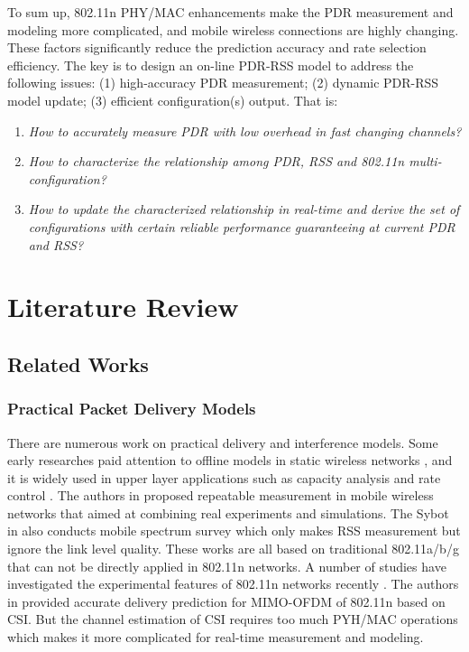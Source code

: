 \documentclass[draftclsnofoot,journal,onecolumn,11pt]{IEEEtran}
\begin{document}
To sum up, 802.11n PHY/MAC enhancements make the PDR measurement and modeling more complicated, and mobile wireless connections are highly changing. These factors significantly reduce the prediction accuracy and rate selection efficiency. The key is to design an on-line PDR-RSS model to address the following issues: (1) high-accuracy PDR measurement; (2) dynamic PDR-RSS model update; (3) efficient configuration(s) output. That is:
\begin{enumerate}
  \item \textit{How to accurately measure PDR with low overhead in fast changing channels?}
  \item \textit{How to characterize the relationship among PDR, RSS and 802.11n multi-configuration?}
  \item \textit{How to update the characterized relationship in real-time and derive the set of configurations with certain reliable performance guaranteeing at current PDR and RSS?}
\end{enumerate}

\section{Literature Review}

\subsection{Related Works}
\subsubsection{Practical Packet Delivery Models}
There are numerous work on practical delivery and interference models. Some early researches paid attention to offline models in static wireless networks \cite{kolar2011mesh} \cite{reis2006model}, and it is widely used in upper layer applications such as capacity analysis \cite{kashyap2007capacity} and rate control \cite{chen2011ram} \cite{judd2008efficient}. The authors in \cite{10.1109/TMC.2009.87} proposed repeatable measurement in mobile wireless networks that aimed at combining real experiments and simulations. The Sybot in \cite{kim2010sybot} also conducts mobile spectrum survey which only makes RSS measurement but ignore the link level quality. These works are all based on traditional 802.11a/b/g that can not be directly applied in 802.11n networks. A number of studies have investigated the experimental features of 802.11n networks recently \cite{Halperin2010predictable} \cite{k.rayanchu:fluid:}. The authors in \cite{Halperin2010predictable} provided accurate delivery prediction for MIMO-OFDM of 802.11n based on CSI. But the channel estimation of CSI \cite{CSI-SF} requires too much PYH/MAC operations which makes it more complicated for real-time measurement and modeling.
\end{document}
